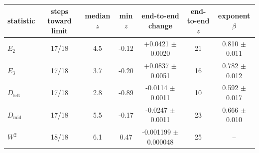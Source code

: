 \begin{tabular}{l c c c c c c}
\toprule
statistic & steps toward limit & median $z$ & min $z$ & end-to-end change & end-to-end $z$ & exponent $\beta$ \\
\midrule
$E_2$ & 17/18 & 4.5 & -0.12 & +0.0421 $\pm$ 0.0020 & 21 & 0.810 $\pm$ 0.011 \\
$E_3$ & 17/18 & 3.7 & -0.20 & +0.0837 $\pm$ 0.0051 & 16 & 0.782 $\pm$ 0.012 \\
$D_{\mathrm{left}}$ & 17/18 & 2.8 & -0.89 & -0.0114 $\pm$ 0.0011 & 10 & 0.592 $\pm$ 0.017 \\
$D_{\mathrm{mid}}$ & 17/18 & 5.5 & -0.17 & -0.0247 $\pm$ 0.0011 & 23 & 0.666 $\pm$ 0.010 \\
$W^2$ & 18/18 & 6.1 & 0.47 & -0.001199 $\pm$ 0.000048 & 25 & -- \\
\bottomrule
\end{tabular}